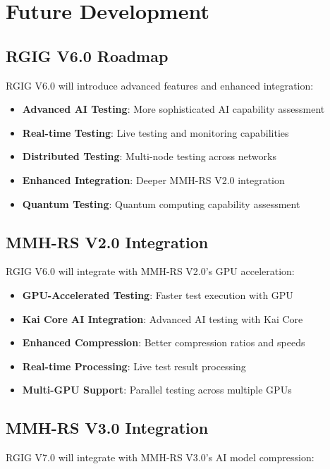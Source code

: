 \documentclass[12pt,a4paper]{article}
\begin{document}
\newpage

\section{Future Development}

\subsection{RGIG V6.0 Roadmap}
RGIG V6.0 will introduce advanced features and enhanced integration:

\begin{itemize}
    \item \textbf{Advanced AI Testing}: More sophisticated AI capability assessment
    \item \textbf{Real-time Testing}: Live testing and monitoring capabilities
    \item \textbf{Distributed Testing}: Multi-node testing across networks
    \item \textbf{Enhanced Integration}: Deeper MMH-RS V2.0 integration
    \item \textbf{Quantum Testing}: Quantum computing capability assessment
\end{itemize}

\subsection{MMH-RS V2.0 Integration}
RGIG V6.0 will integrate with MMH-RS V2.0's GPU acceleration:

\begin{itemize}
    \item \textbf{GPU-Accelerated Testing}: Faster test execution with GPU
    \item \textbf{Kai Core AI Integration}: Advanced AI testing with Kai Core
    \item \textbf{Enhanced Compression}: Better compression ratios and speeds
    \item \textbf{Real-time Processing}: Live test result processing
    \item \textbf{Multi-GPU Support}: Parallel testing across multiple GPUs
\end{itemize}

\subsection{MMH-RS V3.0 Integration}
RGIG V7.0 will integrate with MMH-RS V3.0's AI model compression:
\end{document}
